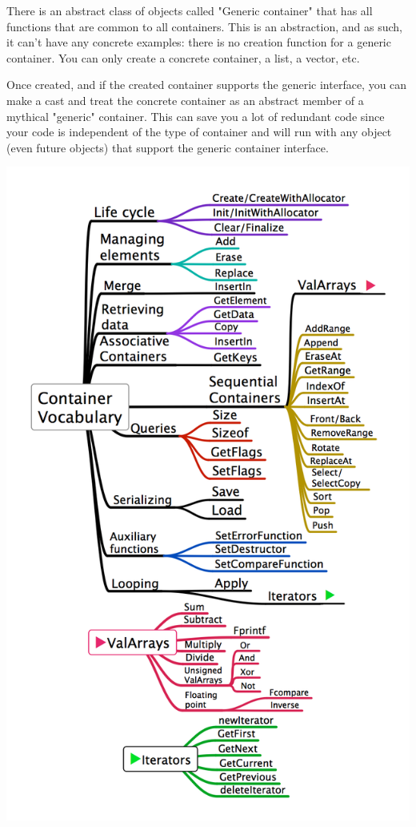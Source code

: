 \documentclass[12pt,a4paper]{memoir} %
\begin{document}
There is an abstract class of objects called "Generic container" that has all functions that are common to all containers. This is an abstraction,
and as such, it can't have any concrete examples: there is no creation function for a generic container. You can only create a concrete container, a list, a vector, etc. 

Once created, and if the created container supports the generic interface, you can make a cast and treat the concrete container as an abstract member
of a mythical "generic" container. This can save you a lot of redundant code since your code is independent of the type of container and will run
with any object (even future objects) that support the generic container interface.

\includegraphics[scale=0.4]{Vocabulary.png}\par
\end{document}
